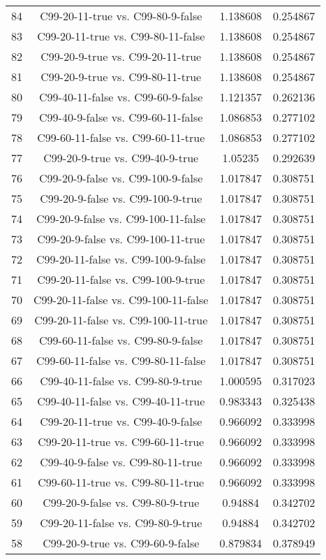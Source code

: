 \documentclass[a4paper,10pt]{article}
\begin{document}
\begin{landscape}
\begin{table}[!htp]
\begin{tabular}{cccc}
84&C99-20-11-true vs. C99-80-9-false&1.138608&0.254867\\
83&C99-20-11-true vs. C99-80-11-false&1.138608&0.254867\\
82&C99-20-9-true vs. C99-20-11-true&1.138608&0.254867\\
81&C99-20-9-true vs. C99-80-11-true&1.138608&0.254867\\
80&C99-40-11-false vs. C99-60-9-false&1.121357&0.262136\\
79&C99-40-9-false vs. C99-60-11-false&1.086853&0.277102\\
78&C99-60-11-false vs. C99-60-11-true&1.086853&0.277102\\
77&C99-20-9-true vs. C99-40-9-true&1.05235&0.292639\\
76&C99-20-9-false vs. C99-100-9-false&1.017847&0.308751\\
75&C99-20-9-false vs. C99-100-9-true&1.017847&0.308751\\
74&C99-20-9-false vs. C99-100-11-false&1.017847&0.308751\\
73&C99-20-9-false vs. C99-100-11-true&1.017847&0.308751\\
72&C99-20-11-false vs. C99-100-9-false&1.017847&0.308751\\
71&C99-20-11-false vs. C99-100-9-true&1.017847&0.308751\\
70&C99-20-11-false vs. C99-100-11-false&1.017847&0.308751\\
69&C99-20-11-false vs. C99-100-11-true&1.017847&0.308751\\
68&C99-60-11-false vs. C99-80-9-false&1.017847&0.308751\\
67&C99-60-11-false vs. C99-80-11-false&1.017847&0.308751\\
66&C99-40-11-false vs. C99-80-9-true&1.000595&0.317023\\
65&C99-40-11-false vs. C99-40-11-true&0.983343&0.325438\\
64&C99-20-11-true vs. C99-40-9-false&0.966092&0.333998\\
63&C99-20-11-true vs. C99-60-11-true&0.966092&0.333998\\
62&C99-40-9-false vs. C99-80-11-true&0.966092&0.333998\\
61&C99-60-11-true vs. C99-80-11-true&0.966092&0.333998\\
60&C99-20-9-false vs. C99-80-9-true&0.94884&0.342702\\
59&C99-20-11-false vs. C99-80-9-true&0.94884&0.342702\\
58&C99-20-9-true vs. C99-60-9-false&0.879834&0.378949\\

\end{tabular}
\end{table}
\end{landscape}
\end{document}
